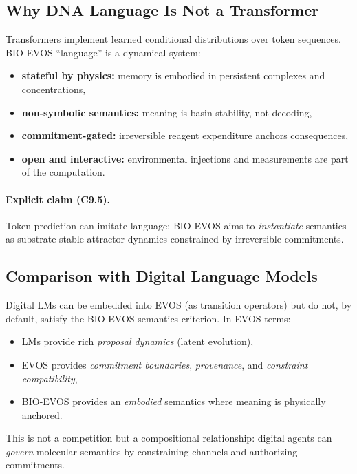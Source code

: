 \documentclass[11pt]{article}
\begin{document}
\subsection{Why DNA Language Is Not a Transformer}
\label{sec:not-a-transformer}

Transformers implement learned conditional distributions over token sequences.
BIO-EVOS ``language'' is a dynamical system:
\begin{itemize}
  \item \textbf{stateful by physics:} memory is embodied in persistent complexes and concentrations,
  \item \textbf{non-symbolic semantics:} meaning is basin stability, not decoding,
  \item \textbf{commitment-gated:} irreversible reagent expenditure anchors consequences,
  \item \textbf{open and interactive:} environmental injections and measurements are part of the computation.
\end{itemize}

\paragraph{Explicit claim (C9.5).}
Token prediction can imitate language; BIO-EVOS aims to \emph{instantiate} semantics as
substrate-stable attractor dynamics constrained by irreversible commitments.

\subsection{Comparison with Digital Language Models}
\label{sec:compare-digital-lms}

Digital LMs can be embedded into EVOS (as transition operators) but do not, by default,
satisfy the BIO-EVOS semantics criterion. In EVOS terms:
\begin{itemize}
  \item LMs provide rich \emph{proposal dynamics} (latent evolution),
  \item EVOS provides \emph{commitment boundaries}, \emph{provenance}, and \emph{constraint compatibility},
  \item BIO-EVOS provides an \emph{embodied} semantics where meaning is physically anchored.
\end{itemize}

This is not a competition but a compositional relationship: digital agents can
\emph{govern} molecular semantics by constraining channels and authorizing commitments.
\end{document}
